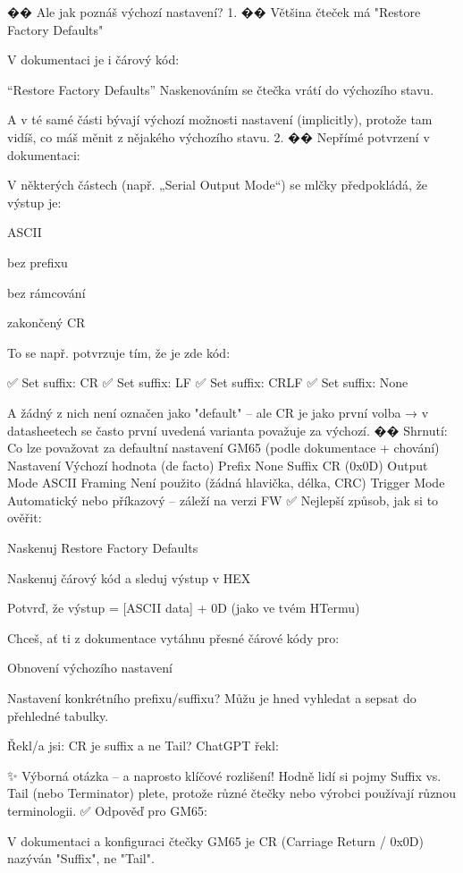 �� Ale jak poznáš výchozí nastavení?
1. �� Většina čteček má "Restore Factory Defaults"

V dokumentaci je i čárový kód:

    “Restore Factory Defaults”
    Naskenováním se čtečka vrátí do výchozího stavu.

A v té samé části bývají výchozí možnosti nastavení (implicitly), protože tam vidíš, co máš měnit z nějakého výchozího stavu.
2. �� Nepřímé potvrzení v dokumentaci:

V některých částech (např. „Serial Output Mode“) se mlčky předpokládá, že výstup je:

    ASCII

    bez prefixu

    bez rámcování

    zakončený CR

To se např. potvrzuje tím, že je zde kód:

    ✅ Set suffix: CR
    ✅ Set suffix: LF
    ✅ Set suffix: CRLF
    ✅ Set suffix: None

A žádný z nich není označen jako "default" – ale CR je jako první volba → v datasheetech se často první uvedená varianta považuje za výchozí.
�� Shrnutí: Co lze považovat za defaultní nastavení GM65 (podle dokumentace + chování)
Nastavení	Výchozí hodnota (de facto)
Prefix	None
Suffix	CR (0x0D)
Output Mode	ASCII
Framing	Není použito (žádná hlavička, délka, CRC)
Trigger Mode	Automatický nebo příkazový – záleží na verzi FW
✅ Nejlepší způsob, jak si to ověřit:

    Naskenuj Restore Factory Defaults

    Naskenuj čárový kód a sleduj výstup v HEX

    Potvrď, že výstup = [ASCII data] + 0D (jako ve tvém HTermu)

Chceš, ať ti z dokumentace vytáhnu přesné čárové kódy pro:

    Obnovení výchozího nastavení

    Nastavení konkrétního prefixu/suffixu? Můžu je hned vyhledat a sepsat do přehledné tabulky.

Řekl/a jsi:
CR je suffix a ne Tail?
ChatGPT řekl:

✨ Výborná otázka – a naprosto klíčové rozlišení! Hodně lidí si pojmy Suffix vs. Tail (nebo Terminator) plete, protože různé čtečky nebo výrobci používají různou terminologii.
✅ Odpověď pro GM65:

    V dokumentaci a konfiguraci čtečky GM65 je CR (Carriage Return / 0x0D) nazýván "Suffix", ne "Tail".

